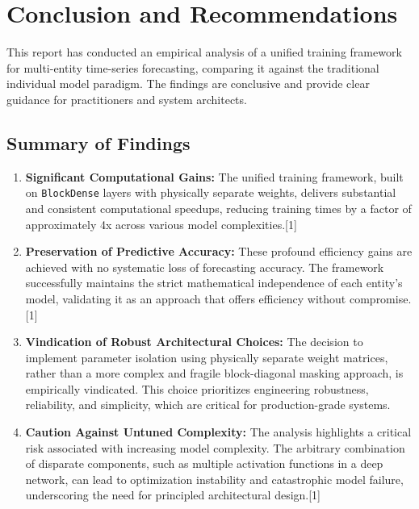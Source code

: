 \documentclass{article}
\begin{document}
\section{Conclusion and Recommendations}

This report has conducted an empirical analysis of a unified training framework for multi-entity time-series forecasting, comparing it against the traditional individual model paradigm. The findings are conclusive and provide clear guidance for practitioners and system architects.

\subsection{Summary of Findings}
\begin{enumerate}
    \item \textbf{Significant Computational Gains:} The unified training framework, built on \texttt{BlockDense} layers with physically separate weights, delivers substantial and consistent computational speedups, reducing training times by a factor of approximately 4x across various model complexities.[1]
    \item \textbf{Preservation of Predictive Accuracy:} These profound efficiency gains are achieved with no systematic loss of forecasting accuracy. The framework successfully maintains the strict mathematical independence of each entity's model, validating it as an approach that offers efficiency without compromise.[1]
    \item \textbf{Vindication of Robust Architectural Choices:} The decision to implement parameter isolation using physically separate weight matrices, rather than a more complex and fragile block-diagonal masking approach, is empirically vindicated. This choice prioritizes engineering robustness, reliability, and simplicity, which are critical for production-grade systems.
    \item \textbf{Caution Against Untuned Complexity:} The analysis highlights a critical risk associated with increasing model complexity. The arbitrary combination of disparate components, such as multiple activation functions in a deep network, can lead to optimization instability and catastrophic model failure, underscoring the need for principled architectural design.[1]
\end{enumerate}
\end{document}
